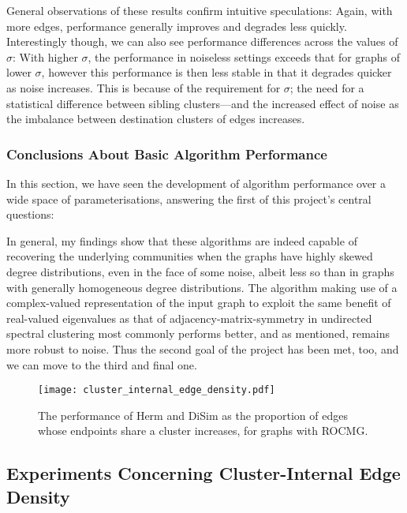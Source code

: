 General observations of these results confirm intuitive speculations: Again, with more edges, 
performance generally improves and degrades less quickly. Interestingly though, we can also see 
performance differences across the values of $\sigma$: With higher $\sigma$, the performance in 
noiseless settings exceeds that for graphs of lower $\sigma$, however this performance is then 
less stable in that it degrades quicker as noise increases. This is because of the requirement for 
$\sigma$; the need for a statistical difference between sibling clusters---and the increased 
effect of noise as the imbalance between destination clusters of edges increases.

\subsubsection{Conclusions About Basic Algorithm Performance}

In this section, we have seen the development of algorithm performance over a wide space of 
parameterisations, answering the first of this project's central questions:

In general, my findings show that these algorithms are indeed capable of recovering the underlying 
communities when the graphs have highly skewed degree distributions, even in the face of some noise,
 albeit less so than in graphs with generally homogeneous degree distributions. The algorithm 
making use of a complex-valued representation of the input graph to exploit the same benefit of 
real-valued eigenvalues as that of adjacency-matrix-symmetry in undirected spectral clustering 
most commonly performs better, and as mentioned, remains more robust to noise. Thus the second goal of the project has been met, too, and we can move to the third and final one.

\begin{figure}
\begin{center}
\texttt{[image: cluster\_internal\_edge\_density.pdf]}
\end{center}
\caption{The performance of Herm and DiSim as the proportion of edges whose endpoints share a 
cluster increases, for graphs with ROCMG.}
\label{fig:intedgdens}
\end{figure}
\subsection{Experiments Concerning Cluster-Internal Edge Density}

